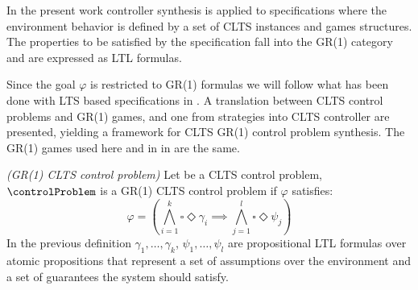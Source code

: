 In the present work controller synthesis is applied to specifications where the environment behavior is defined by a set of CLTS instances and games structures. The properties to be satisfied by the specification fall into the GR(1) category and are expressed as LTL formulas.

Since the goal $\varphi$ is restricted to GR(1) formulas we will follow what has been done with LTS based specifications in \cite{DBLP:phd/ethos/DIppolito13}. A translation between CLTS control problems and GR(1) games, and one from strategies into CLTS controller are presented, yielding a framework for CLTS GR(1) control problem synthesis. The GR(1) games used here and in in \cite{DBLP:phd/ethos/DIppolito13} are the same.

\begin{definition}\label{def:gr1_clts_control_problem} \emph{(GR(1) CLTS control problem)} 
	Let \controlProblemDef be a CLTS control problem, $\controlProblem$ is a GR(1) CLTS control problem if $\varphi$ satisfies: 
	\[\varphi = (\bigwedge_{i=1}^k\square \Diamond \gamma_i \implies \bigwedge_{j=1}^l\square \Diamond \psi_j)\]
	In the previous definition $\gamma_1, \ldots , \gamma_k$, $\psi_1, \ldots , \psi_l$ are propositional LTL formulas over atomic propositions that represent a set of assumptions over the environment and a set of guarantees the system should satisfy.
\end{definition}

%

